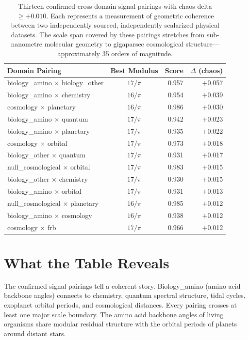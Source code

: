\documentclass[11pt, letterpaper, openany]{book}
\begin{document}
\begin{table}[H]
\centering
\renewcommand{\arraystretch}{1.4}
\begin{tabular}{|l|c|r|r|}
\hline
\textbf{Domain Pairing} & \textbf{Best Modulus} & \textbf{Score} & \textbf{$\Delta$ (chaos)} \\
\hline\hline
biology\_amino $\times$ biology\_other & $17/\pi$ & 0.957 & $+$0.057 \\
biology\_amino $\times$ chemistry & $16/\pi$ & 0.954 & $+$0.039 \\
cosmology $\times$ planetary & $16/\pi$ & 0.986 & $+$0.030 \\
biology\_amino $\times$ quantum & $17/\pi$ & 0.942 & $+$0.023 \\
biology\_amino $\times$ planetary & $17/\pi$ & 0.935 & $+$0.022 \\
cosmology $\times$ orbital & $17/\pi$ & 0.973 & $+$0.018 \\
biology\_other $\times$ quantum & $17/\pi$ & 0.931 & $+$0.017 \\
null\_cosmological $\times$ orbital & $17/\pi$ & 0.983 & $+$0.015 \\
biology\_other $\times$ chemistry & $17/\pi$ & 0.930 & $+$0.015 \\
biology\_amino $\times$ orbital & $17/\pi$ & 0.931 & $+$0.013 \\
null\_cosmological $\times$ planetary & $16/\pi$ & 0.985 & $+$0.012 \\
biology\_amino $\times$ cosmology & $16/\pi$ & 0.938 & $+$0.012 \\
cosmology $\times$ frb & $17/\pi$ & 0.966 & $+$0.012 \\
\hline
\end{tabular}
\caption{Thirteen confirmed cross-domain signal pairings with chaos delta $\geq +0.010$.
Each represents a measurement of geometric coherence between two independently sourced,
independently scalarized physical datasets. The scale span covered by these pairings stretches from
sub-nanometre molecular geometry to gigaparsec cosmological structure---approximately 35 orders
of magnitude.}
\label{tab:signals}
\end{table}

\section*{What the Table Reveals}

The confirmed signal pairings tell a coherent story. Biology_amino (amino acid backbone
angles) connects to chemistry, quantum spectral structure, tidal cycles, exoplanet orbital
periods, and cosmological distances. Every pairing crosses at least one major scale
boundary. The amino acid backbone angles of living organisms share modular residual structure
with the orbital periods of planets around distant stars.
\end{document}
